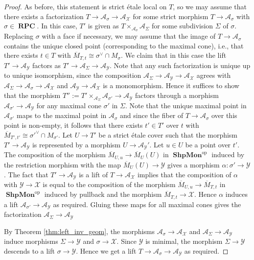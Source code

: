 \documentclass[11pt]{amsart}
\theoremstyle{definition}
\theoremstyle{remark}
\def\op{\mathrm{op}}
\DeclareMathOperator{\ShpMon}{\mathbf{ShpMon}}
\DeclareMathOperator{\RPC}{\mathbf{RPC}}
\begin{document}
\begin{proof}
	As before, this statement is strict étale local on $T$, so we may assume that there exists a factorization
	$T\to \mathcal{A}_{\sigma}\to \mathcal{A}_{\mathcal{X}}$ for some strict morphism $T\to \mathcal{A}_{\sigma}$
	with $\sigma\in \RPC$. In this case, $T'$ is given as $T\times_{\mathcal{A}_{\sigma}}\mathcal{A}_{\Sigma}$ for
	some subdivision $\Sigma$ of $\sigma$. Replacing $\sigma$ with a face if necessary, we may assume that the image
	of $T\to \mathcal{A}_{\sigma}$ contains the unique closed point (corresponding to the maximal cone), i.e., that
	there exists $t\in T$ with $\overline{M}_{T,t}\cong \sigma^{\vee}\cap M_{\sigma}$. We claim that in this case
	the lift $T'\to \mathcal{A}_{\mathcal{Y}}$ factors as $T'\to \mathcal{A}_{\Sigma}\to \mathcal{A}_{\mathcal{Y}}$.
	Note that any such factorization is unique up to unique isomorphism, since the composition
	$\mathcal{A}_{\Sigma}\to \mathcal{A}_{\mathcal{Y}}\to \mathcal{A}_{\mathcal{X}}$ agrees with
	$\mathcal{A}_{\Sigma}\to \mathcal{A}_{\sigma}\to \mathcal{A}_{\mathcal{X}}$ and $\mathcal{A}_{\mathcal{Y}}\to \mathcal{A}_{\mathcal{X}}$
	is a monomorphism. Hence it suffices to show that the morphism $T'':=T'\times_{\mathcal{A}_{\Sigma}}\mathcal{A}_{\sigma'}\to \mathcal{A}_{\mathcal{Y}}$
	factors through a morphism $\mathcal{A}_{\sigma'}\to \mathcal{A}_{\mathcal{Y}}$ for any maximal cone $\sigma'$ in $\Sigma$.
	Note that the unique maximal point in $\mathcal{A}_{\sigma'}$ maps to the maximal point in $\mathcal{A}_{\sigma}$ and since
	the fiber of $T\to \mathcal{A}_{\sigma}$ over this point is non-empty, it follows that there exists $t'\in T'$ over $t$ with
	$\overline{M}_{T',t'}\cong \sigma'^{\vee}\cap M_{\sigma'}$. Let $U\to T'$ be a strict étale cover such that the morphism
	$T'\to \mathcal{A}_{\mathcal{Y}}$ is represented by a morphism $U\to \mathcal{A}_{\mathcal{Y}}'$. Let $u\in U$ be a point
	over $t'$. The composition of the morphism $\overline{M}_{U,u}\to \overline{M}_U(U)$ in $\ShpMon^{\op}$ induced by the restriction
	morphism with the map $\overline{M}_U(U)\to \mathcal{Y}$ gives a morphism $\alpha:\sigma'\to \mathcal{Y}$. The fact that $T'\to \mathcal{A}_{\mathcal{Y}}$
	is a lift of $T\to \mathcal{A}_{\mathcal{X}}$ implies that the composition of $\alpha$ with $\mathcal{Y}\to \mathcal{X}$ is equal
	to the composition of the morphism $\overline{M}_{U,u}\to \overline{M}_{T,t}$ in $\ShpMon^{\op}$ induced by pullback and the
	morphism $\overline{M}_{T,t}\to \mathcal{X}$. Hence $\alpha$ induces a lift $\mathcal{A}_{\sigma'}\to \mathcal{A}_{\mathcal{Y}}$
	as required. Gluing these maps for all maximal cones gives the factorization $\mathcal{A}_{\Sigma}\to \mathcal{A}_{\mathcal{Y}}$

	By Theorem \ref{thm:left_inv_geom}, the morphisms $\mathcal{A}_{\sigma}\to \mathcal{A}_{\mathcal{X}}$
	and $\mathcal{A}_{\Sigma}\to \mathcal{A}_{\mathcal{Y}}$ induce morphisms $\Sigma\to \mathcal{Y}$ and $\sigma\to \mathcal{X}$.
	Since $\mathcal{Y}$ is minimal, the morphism $\Sigma\to \mathcal{Y}$ descends to a lift $\sigma\to \mathcal{Y}$. Hence we get
	a lift $T\to \mathcal{A}_{\sigma}\to \mathcal{A}_{\mathcal{Y}}$ as required.
\end{proof}
\end{document}
